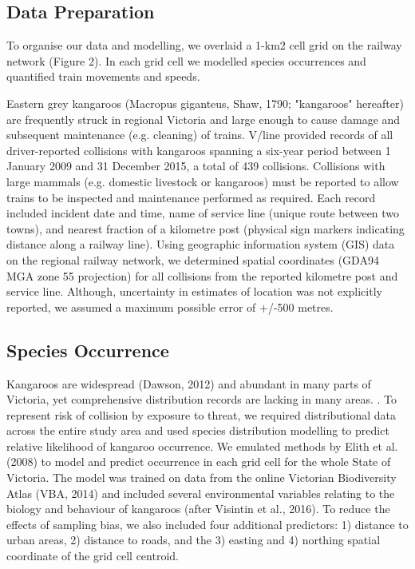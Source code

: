 \subsection{Data Preparation}

To organise our data and modelling, we overlaid a 1-km2 cell grid on the railway network (Figure 2).  In each grid cell we modelled species occurrences and quantified train movements and speeds.

Eastern grey kangaroos (Macropus giganteus, Shaw, 1790; "kangaroos" hereafter) are frequently struck in regional Victoria and large enough to cause damage and subsequent maintenance (e.g. cleaning) of trains.  V/line provided records of all driver-reported collisions with kangaroos spanning a six-year period between 1 January 2009 and 31 December 2015, a total of 439 collisions. Collisions with large mammals (e.g. domestic livestock or kangaroos) must be reported to allow trains to be inspected and maintenance performed as required. Each record included incident date and time, name of service line (unique route between two towns), and nearest fraction of a kilometre post (physical sign markers indicating distance along a railway line).  Using geographic information system (GIS) data on the regional railway network, we determined spatial coordinates (GDA94 MGA zone 55 projection) for all collisions from the reported kilometre post and service line. Although, uncertainty in estimates of location was not explicitly reported, we assumed a maximum possible error of +/-500 metres.

\subsection{Species Occurrence}

Kangaroos are widespread (Dawson, 2012) and abundant in many parts of Victoria, yet comprehensive distribution records are lacking in many areas. . To represent risk of collision by exposure to threat, we required distributional data across the entire study area and used species distribution modelling to predict relative likelihood of kangaroo occurrence.  We emulated methods by Elith et al. (2008) to model and predict occurrence in each grid cell for the whole State of Victoria. The model was trained on data from the online Victorian Biodiversity Atlas (VBA, 2014) and included several environmental variables relating to the biology and behaviour of kangaroos (after Visintin et al., 2016).  To reduce the effects of sampling bias, we also included four additional predictors:  1) distance to urban areas, 2) distance to roads, and the 3) easting and 4) northing spatial coordinate of the grid cell centroid.

